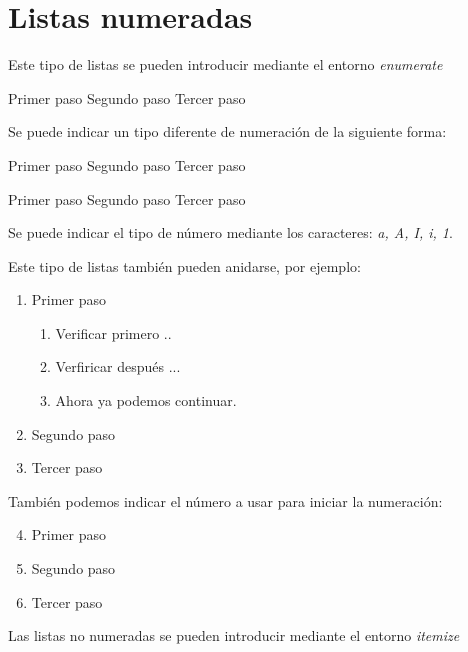 \documentclass[letterpaper,12pt]{article}
\begin{document}
\section{Listas numeradas}

Este tipo de listas se pueden introducir mediante el entorno \textit{enumerate}

Primer paso
Segundo paso
Tercer paso

Se puede indicar un tipo diferente de numeración de la siguiente forma:

Primer paso
Segundo paso
Tercer paso

\bigskip

Primer paso
Segundo paso
Tercer paso

Se puede indicar el tipo de número mediante los caracteres: \textit{a, A, I, i, 1}.

Este tipo de listas también pueden anidarse, por ejemplo:

\begin{enumerate}
	\item Primer paso
		\begin{enumerate}
			\item Verificar primero ..
			\item Verfiricar después ...
			\item Ahora ya podemos continuar.
		\end{enumerate}
	\item Segundo paso
	\item Tercer paso
\end{enumerate}

También podemos indicar el número a usar para iniciar la numeración:

\begin{enumerate}
	\setcounter{enumi}{3}
	\item Primer paso
	\item Segundo paso
	\item Tercer paso
\end{enumerate}


Las listas no numeradas se pueden introducir mediante el entorno \textit{itemize} 
\end{document}

